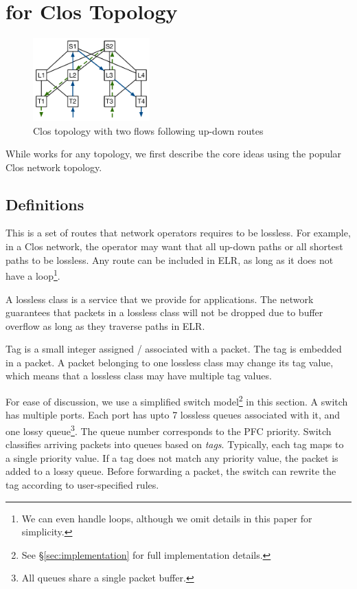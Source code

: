 \section{\sysname{} for Clos Topology}
\label{sec:specific}

\begin{figure}[t]
		\centering
		\includegraphics[width=0.4\textwidth] {figs/updown_paths}
		\caption{Clos topology with two flows following up-down routes}
		\label{fig:basic_clos}
\end{figure}

While \sysname{} works for any topology, we first describe the core ideas using
the popular Clos network topology.

\subsection {Definitions}

 This is a set of routes that network
operators requires to be lossless. For example, in a Clos network, the operator
may want that all up-down paths or all shortest paths to be lossless.  Any route
can be included in ELR, as long as it does not have a loop\footnote{We can even
handle loops, although we omit details in this paper for simplicity.}.

 A lossless class is a service that we provide for
applications. The network guarantees that packets in a lossless class will not
be dropped due to buffer overflow as long as they traverse paths in ELR.

 Tag is a small integer assigned / associated with a packet. The tag
is embedded in a packet. A packet belonging to one lossless class may change its
tag value, which means that a lossless class may have multiple tag values.

 For ease of discussion, we use a simplified
switch model\footnote{See \S\ref{sec:implementation} for full implementation
details.} in this section.  A switch has multiple ports. Each port has upto 7
lossless queues associated with it, and one lossy queue\footnote{All queues
share a single packet buffer.}. The queue number corresponds to the PFC priority.
Switch classifies arriving packets into queues based on {\em tags}.  Typically,
each tag maps to a single priority value. If a tag does not match any priority
value, the packet is added to a lossy queue. Before forwarding a packet, the
switch can rewrite the tag according to user-specified rules.


